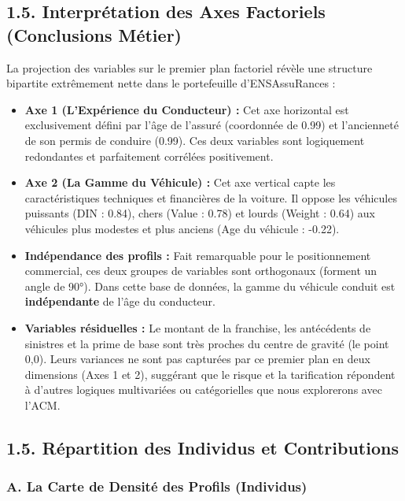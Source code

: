\documentclass[
]{article}
\providecommand{\tightlist}{%
  \setlength{\itemsep}{0pt}\setlength{\parskip}{0pt}}
\begin{document}
\subsection{1.5. Interprétation des Axes Factoriels (Conclusions
Métier)}\label{interpruxe9tation-des-axes-factoriels-conclusions-muxe9tier}

La projection des variables sur le premier plan factoriel révèle une
structure bipartite extrêmement nette dans le portefeuille
d'ENSAssuRances :

\begin{itemize}
\tightlist
\item
  \textbf{Axe 1 (L'Expérience du Conducteur) :} Cet axe horizontal est
  exclusivement défini par l'âge de l'assuré (coordonnée de 0.99) et
  l'ancienneté de son permis de conduire (0.99). Ces deux variables sont
  logiquement redondantes et parfaitement corrélées positivement.
\item
  \textbf{Axe 2 (La Gamme du Véhicule) :} Cet axe vertical capte les
  caractéristiques techniques et financières de la voiture. Il oppose
  les véhicules puissants (DIN : 0.84), chers (Value : 0.78) et lourds
  (Weight : 0.64) aux véhicules plus modestes et plus anciens (Age du
  véhicule : -0.22).
\item
  \textbf{Indépendance des profils :} Fait remarquable pour le
  positionnement commercial, ces deux groupes de variables sont
  orthogonaux (forment un angle de 90°). Dans cette base de données, la
  gamme du véhicule conduit est \textbf{indépendante} de l'âge du
  conducteur.
\item
  \textbf{Variables résiduelles :} Le montant de la franchise, les
  antécédents de sinistres et la prime de base sont très proches du
  centre de gravité (le point 0,0). Leurs variances ne sont pas
  capturées par ce premier plan en deux dimensions (Axes 1 et 2),
  suggérant que le risque et la tarification répondent à d'autres
  logiques multivariées ou catégorielles que nous explorerons avec
  l'ACM.
\end{itemize}

\subsection{1.5. Répartition des Individus et
Contributions}\label{ruxe9partition-des-individus-et-contributions}

\subsubsection{A. La Carte de Densité des Profils
(Individus)}\label{a.-la-carte-de-densituxe9-des-profils-individus}
\end{document}
